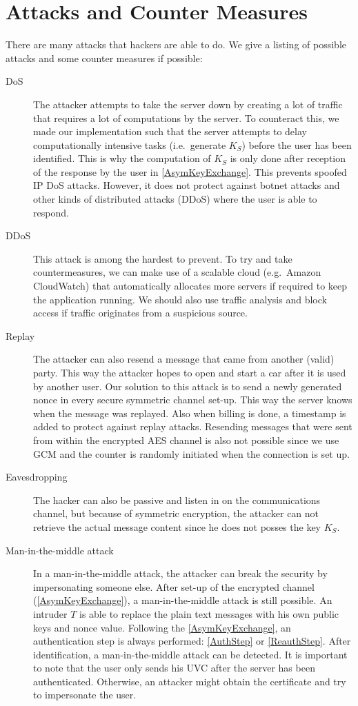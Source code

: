 \section{Attacks and Counter Measures}

There are many attacks that hackers are able to do. We give a listing of possible attacks and some counter measures if possible:

\begin{description}
  \item[DoS] The attacker attempts to take the server down by creating a lot of traffic that requires a lot of computations by the server. To counteract this, we made our implementation such that the server attempts to delay computationally intensive tasks (i.e.\ generate $K_S$) before the user has been identified. This is why the computation of $K_S$ is only done after reception of the response by the user in \cref{AsymKeyExchange}. This prevents spoofed IP DoS attacks. However, it does not protect against botnet attacks and other kinds of distributed attacks (DDoS) where the user is able to respond.
  \item[DDoS] This attack is among the hardest to prevent. To try and take countermeasures, we can make use of a scalable cloud (e.g.\ Amazon CloudWatch) that automatically allocates more servers if required to keep the application running. We should also use traffic analysis and block access if traffic originates from a suspicious source.
  \item[Replay] The attacker can also resend a message that came from another (valid) party. This way the attacker hopes to open and start a car after it is used by another user. Our solution to this attack is to send a newly generated nonce in every secure symmetric channel set-up. This way the server knows when the message was replayed. Also when billing is done, a timestamp is added to protect against replay attacks. Resending messages that were sent from within the encrypted AES channel is also not possible since we use GCM and the counter is randomly initiated when the connection is set up.
  \item[Eavesdropping] The hacker can also be passive and listen in on the communications channel, but because of symmetric encryption, the attacker can not retrieve the actual message content since he does not posses the key $K_S$.
  \item[Man-in-the-middle attack] In a man-in-the-middle attack, the attacker can break the security by impersonating someone else. After set-up of the encrypted channel (\cref{AsymKeyExchange}), a man-in-the-middle attack is still possible. An intruder $T$ is able to replace the plain text messages with his own public keys and nonce value. Following the \cref{AsymKeyExchange}, an authentication step is always performed: \cref{AuthStep} or \cref{ReauthStep}. After identification, a man-in-the-middle attack can be detected. It is important to note that the user only sends his UVC after the server has been authenticated. Otherwise, an attacker might obtain the certificate and try to impersonate the user. \\

\end{description}
